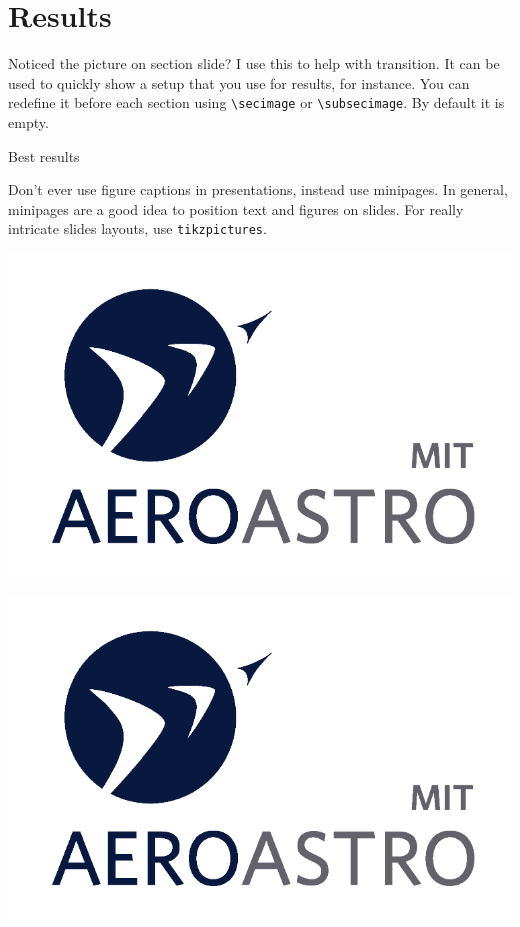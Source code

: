 \documentclass[unknownkeysallowed,aspectratio=43,10pt,onlymath]{beamer}
\begin{document}
\section{Results}

\begin{frame}{Noticed the picture on section slide?}
  I use this to help with transition. It can be used to quickly show a setup that you use for results, for instance.
  You can redefine it before each section using \texttt{\textbackslash secimage} or \texttt{\textbackslash subsecimage}. By default it is empty.
\end{frame}

\begin{frame}{Best results}

Don't \alert{ever} use figure captions in presentations, instead use minipages. In general, minipages are a good idea to position text and figures on slides. For really intricate slides layouts, use \texttt{tikzpictures}.

\begin{minipage}{0.485\textwidth}
\includegraphics[width=\linewidth]{figures/logos/AeroAstroDB}
\end{minipage}\hfill
\begin{minipage}{0.485\textwidth}
\includegraphics[width=\linewidth]{figures/logos/AeroAstroDB}
\end{minipage}

\end{frame}
\end{document}
